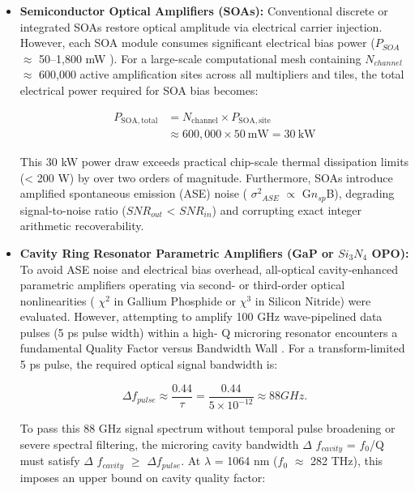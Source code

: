\documentclass[journal]{IEEEtran}
\begin{document}
\begin{itemize}
\item \textbf{Semiconductor Optical Amplifiers (SOAs):} Conventional discrete or integrated SOAs restore optical amplitude via electrical carrier injection. However, each SOA module consumes significant electrical bias power ($P_{SOA}$ $\approx$ 50--1,800 mW ). For a large-scale computational mesh containing $N_{channel}$ $\approx$ 600,000 active amplification sites across all multipliers and tiles, the total electrical power required for SOA bias becomes:

\begin{equation}
\begin{aligned}
P_{\mathrm{SOA,total}}
&= N_{\mathrm{channel}} \times P_{\mathrm{SOA,site}} \\
&\approx 600{,}000 \times 50~\mathrm{mW}
= 30~\mathrm{kW}
\end{aligned}
\end{equation}

This 30 kW power draw exceeds practical chip-scale thermal dissipation limits (< 200 W) by over two orders of magnitude. Furthermore, SOAs introduce amplified spontaneous emission (ASE) noise ( ${\sigma^{2}}_{ASE}$ $\propto$ G$n_{sp}$B), degrading signal-to-noise ratio ($SNR_{out}$ < $SNR_{in}$) and corrupting exact integer arithmetic recoverability.

\item \textbf{Cavity Ring Resonator Parametric Amplifiers (GaP or $Si_3N_4$ OPO):} To avoid ASE noise and electrical bias overhead, all-optical cavity-enhanced parametric amplifiers operating via second- or third-order optical nonlinearities ( $\chi^{2}$ in Gallium Phosphide or $\chi^{3}$ in Silicon Nitride) were evaluated. However, attempting to amplify 100 GHz wave-pipelined data pulses (5 ps pulse width) within a high- Q microring resonator encounters a fundamental Quality Factor versus Bandwidth Wall . For a transform-limited 5 ps pulse, the required optical signal bandwidth is:


\begin{equation}
\Delta f_{pulse} \approx \frac{0.44}{\tau}
= \frac{0.44}{5 \times 10^{-12}} \approx 88 GHz.
\end{equation}

To pass this 88 GHz signal spectrum without temporal pulse broadening or severe spectral filtering, the microring cavity bandwidth $\Delta$ $f_{cavity}$ = $f_{0}$/Q must satisfy $\Delta$ $f_{cavity}$ $\ge$ $\Delta$$f_{pulse}$. At $\lambda$ = 1064 nm ($f_{0}$ $\approx$ 282 THz),
this imposes an upper bound on cavity quality factor:


\end{itemize}
\end{document}
